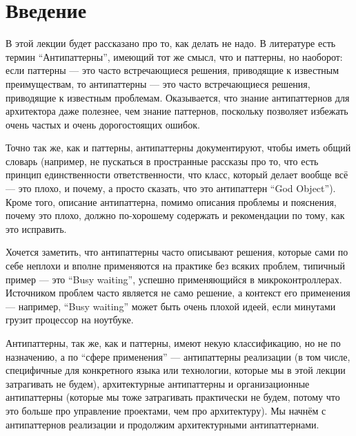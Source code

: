 \documentclass{../text-style}
\author{Юрий Литвинов\\\small{y.litvinov@spbu.ru}}
\begin{document}
\maketitle
\thispagestyle{empty}

\section{Введение}

В этой лекции будет рассказано про то, как делать не надо. В литературе есть термин ``Антипаттерны'', имеющий тот же смысл, что и паттерны, но наоборот: если паттерны --- это часто встречающиеся решения, приводящие к известным преимуществам, то антипаттерны --- это часто встречающиеся решения, приводящие к известным проблемам. Оказывается, что знание антипаттернов для архитектора даже полезнее, чем знание паттернов, поскольку позволяет избежать очень частых и очень дорогостоящих ошибок.

Точно так же, как и паттерны, антипаттерны документируют, чтобы иметь общий словарь (например, не пускаться в пространные рассказы про то, что есть принцип единственности ответственности, что класс, который делает вообще всё --- это плохо, и почему, а просто сказать, что это антипаттерн ``God Object''). Кроме того, описание антипаттерна, помимо описания проблемы и пояснения, почему это плохо, должно по-хорошему содержать и рекомендации по тому, как это исправить. 

Хочется заметить, что антипаттерны часто описывают решения, которые сами по себе неплохи и вполне применяются на практике без всяких проблем, типичный пример --- это ``Busy waiting'', успешно применяющийся в микроконтроллерах. Источником проблем часто является не само решение, а контекст его применения --- например, ``Busy waiting'' может быть очень плохой идеей, если минутами грузит процессор на ноутбуке.

Антипаттерны, так же, как и паттерны, имеют некую классификацию, но не по назначению, а по ``сфере применения'' --- антипаттерны реализации (в том числе, специфичные для конкретного языка или технологии, которые мы в этой лекции затрагивать не будем), архитектурные антипаттерны и организационные антипаттерны (которые мы тоже затрагивать практически не будем, потому что это больше про управление проектами, чем про архитектуру). Мы начнём с антипаттернов реализации и продолжим архитектурными антипаттернами.
\end{document}
